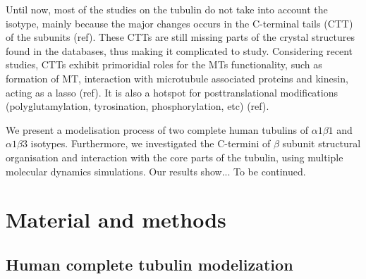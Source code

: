 \documentclass[a4paper]{article}
\begin{document}
Until now, most of the studies on the tubulin do not take into account the isotype, mainly
because the major changes occurs in the C-terminal tails (CTT) of the subunits (ref). These CTTs
are still missing parts of the crystal structures found in the databases, thus making it
complicated to study. Considering recent studies, CTTs exhibit primoridial roles for the
MTs functionality, such as formation of MT, interaction with microtubule associated proteins and
kinesin, acting as a lasso (ref). It is also a hotspot for posttranslational modifications
(polyglutamylation, tyrosination, phosphorylation, etc) (ref).

We present a modelisation process of two complete human tubulins of $\alpha1\beta1$ and
$\alpha1\beta3$ isotypes. Furthermore, we investigated the C-termini of $\beta$ subunit
structural organisation and interaction with the core parts of the tubulin, using
multiple molecular dynamics simulations. Our results show... To be continued.

\section{Material and methods}

\subsection{Human complete tubulin modelization}

\end{document}
